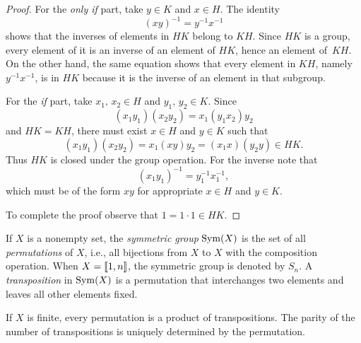 \begin{proof}

For the \textit{only if\/} part, take $y\in K$ and $x \in H$. The identity
$$
    (xy)^{-1} = y^{-1}x^{-1}
$$
shows that the inverses of elements in $HK$ belong to $KH$. Since $HK$ is a group, every element of it is an inverse of an element of $HK$, hence an element of~$KH$. On the other hand, the same equation shows that every element in $KH$, namely $y^{-1}x^{-1}$, is in $HK$ because it is the inverse of an element in that subgroup.

For the \textit{if\/} part, take $x_1,\, x_2\in H$ and $y_1,\, y_2\in K$. Since
$$
    (x_1y_1)(x_2y_2) = x_1(y_1x_2)y_2
$$
and $HK=KH$, there must exist $x\in H$ and $y\in K$ such that
$$
    (x_1y_1)(x_2y_2) = x_1(xy)y_2 = (x_1x)(y_2y) \in HK.
$$
Thus $HK$ is closed under the group operation. For the inverse note that
$$
    (x_1y_1)^{-1} = y_1^{-1}x_1^{-1},
$$
which must be of the form $xy$ for appropriate $x\in H$ and $y\in K$.

To complete the proof observe that $1=1\cdot1\in HK$. \end{proof}

\begin{defns} {}
    If $X$ is a nonempty set, the \textsl{symmetric group} ${\rm Sym}(X)$ is the set of all \textsl{permutations} of $X$, i.e., all bijections from $X$ to $X$ with the composition operation. When $X=\llbracket1,n\rrbracket$, the symmetric group is denoted by $S_n$. A \textsl{transposition} in ${\rm Sym}(X)$ is a permutation that interchanges two elements and leaves all other elements fixed.
\end{defns}

\begin{lem}\label{sign-of-permutation}
    If $X$ is finite, every permutation is a product of transpositions. The parity of the number of transpositions is uniquely determined by the permutation.
\end{lem}

